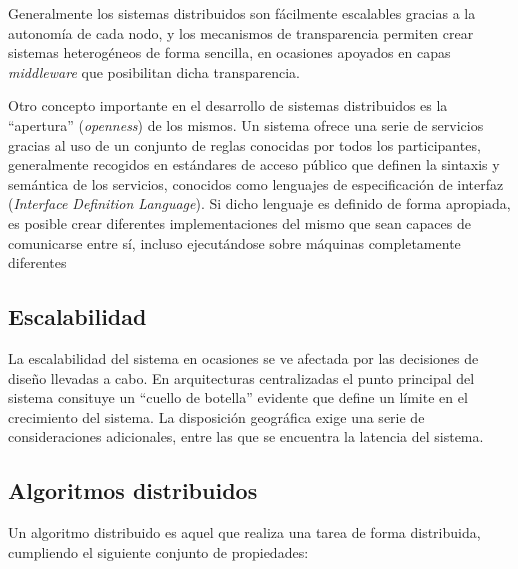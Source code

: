 Generalmente los sistemas distribuidos son fácilmente escalables gracias a la autonomía de cada nodo, y los mecanismos de transparencia permiten crear sistemas heterogéneos de forma sencilla, en ocasiones apoyados en capas \textit{middleware} que posibilitan dicha transparencia.

Otro concepto importante en el desarrollo de sistemas distribuidos es la ``apertura'' (\textit{openness}) de los mismos. Un sistema ofrece una serie de servicios gracias al uso de un conjunto de reglas conocidas por todos los participantes, generalmente recogidos en estándares de acceso público que definen la sintaxis y semántica de los servicios, conocidos como lenguajes de especificación de interfaz (\textit{Interface Definition Language}). Si dicho lenguaje es definido de forma apropiada, es posible crear diferentes implementaciones del mismo que sean capaces de comunicarse entre sí, incluso ejecutándose sobre máquinas completamente diferentes

\subsection{Escalabilidad}

La escalabilidad del sistema en ocasiones se ve afectada por las decisiones de diseño llevadas a cabo. En arquitecturas centralizadas el punto principal del sistema consituye un ``cuello de botella'' evidente que define un límite en el crecimiento del sistema. La disposición geográfica exige una serie de consideraciones adicionales, entre las que se encuentra la latencia del sistema.

\subsection{Algoritmos distribuidos}

Un algoritmo distribuido es aquel que realiza una tarea de forma distribuida, cumpliendo el siguiente conjunto de propiedades:

